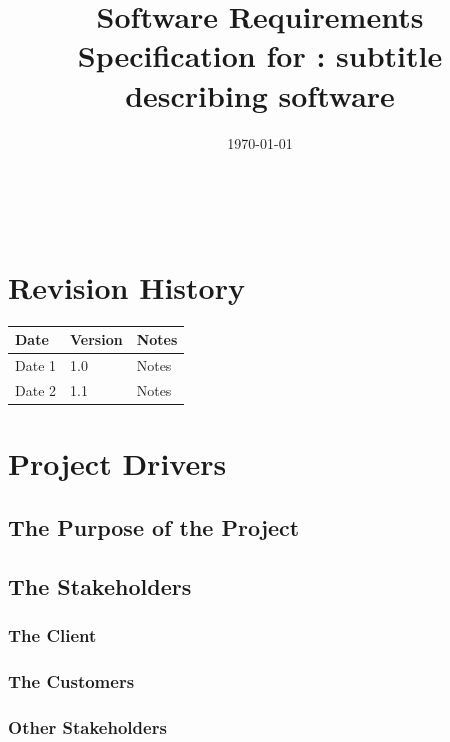 \documentclass[12pt]{article}
\begin{document}
\title{Software Requirements Specification for \progname: subtitle describing software} 
\author{\authname}
\date{\today}
	
\maketitle

~\newpage


\tableofcontents

\pagebreak

\section*{Revision History}

\begin{tabularx}{\textwidth}{p{3cm}p{2cm}X}
\toprule {\bf Date} & {\bf Version} & {\bf Notes}\\
\midrule
Date 1 & 1.0 & Notes\\
Date 2 & 1.1 & Notes\\
\bottomrule
\end{tabularx}


\section{Project Drivers}

\subsection{The Purpose of the Project}

\subsection{The Stakeholders}

\subsubsection{The Client}

\subsubsection{The Customers}

\subsubsection{Other Stakeholders}
\end{document}
